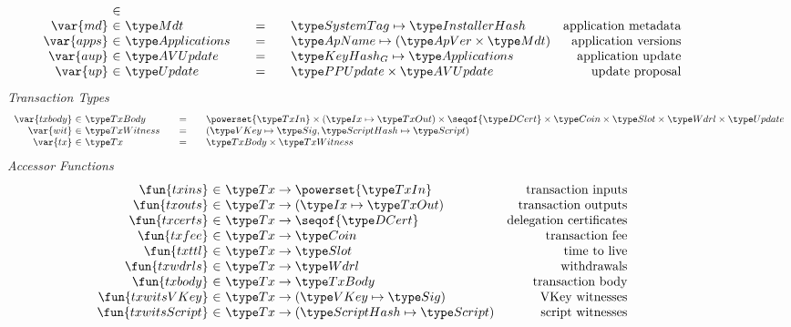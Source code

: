 \begin{figure*}[htb]
\begin{equation*}
\begin{array}{r@{~\in~}l@{\qquad=\qquad}lr}
      \\
      \var{md}
      & \Metadata
      & \SystemTag\mapsto\InstallerHash
      & \text{application metadata}
      \\
      \var{apps}
      & \Applications
      & \ApName \mapsto (\ApVer \times \Metadata)
      & \text{application versions}
      \\
      \var{aup}
      & \AVUpdate
      & \KeyHashGen \mapsto \Applications
      & \text{application update}
      \\
      \var{up}
      & \Update
      & \PPUpdate \times \AVUpdate
      & \text{update proposal}
    \end{array}
  \end{equation*}
  \emph{Transaction Types}
  \begin{equation*}
    \begin{array}{r@{~\in~}l@{\qquad=\qquad}l}
      \var{txbody}
      & \TxBody
      & \powerset{\TxIn} \times (\Ix \mapsto \TxOut) \times \seqof{\DCert}
        \times \Coin \times \Slot \times \Wdrl \times \Update
      \\
      \var{wit} & \TxWitness & (\VKey \mapsto \Sig, \HashScr \mapsto \Script)
      \\
      \var{tx}
      & \Tx
      & \TxBody \times \TxWitness
    \end{array}
  \end{equation*}
  \emph{Accessor Functions}
  \begin{equation*}
    \begin{array}{r@{~\in~}lr}
      \fun{txins} & \Tx \to \powerset{\TxIn} & \text{transaction inputs} \\
      \fun{txouts} & \Tx \to (\Ix \mapsto \TxOut) & \text{transaction outputs} \\
      \fun{txcerts} & \Tx \to \seqof{\DCert} & \text{delegation certificates} \\
      \fun{txfee} & \Tx \to \Coin & \text{transaction fee} \\
      \fun{txttl} & \Tx \to \Slot & \text{time to live} \\
      \fun{txwdrls} & \Tx \to \Wdrl & \text{withdrawals} \\
      \fun{txbody} & \Tx \to \TxBody & \text{transaction body}\\
      \fun{txwitsVKey} & \Tx \to (\VKey \mapsto \Sig) & \text{VKey witnesses} \\
      \fun{txwitsScript} & \Tx \to (\HashScr \mapsto \Script) & \text{script witnesses}\\

\end{array}
\end{equation*}
\end{figure*}
